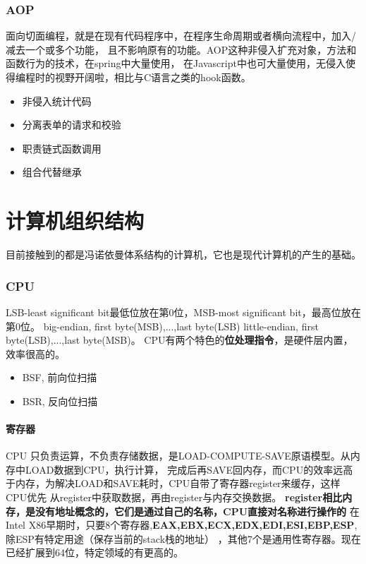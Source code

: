 \subsection{AOP}
面向切面编程，就是在现有代码程序中，在程序生命周期或者横向流程中，加入/减去一个或多个功能，
且不影响原有的功能。AOP这种非侵入扩充对象，方法和函数行为的技术，在spring中大量使用，
在Javascript中也可大量使用，无侵入使得编程时的视野开阔啦，相比与C语言之类的hook函数。
\begin{itemize}
    \item {非侵入统计代码}
    \item {分离表单的请求和校验}
    \item {职责链式函数调用}
    \item {组合代替继承}
\end{itemize}


\chapter{计算机组织结构}
目前接触到的都是冯诺依曼体系结构的计算机，它也是现代计算机的产生的基础。
\subsection{CPU}
LSB-least significant bit最低位放在第0位，MSB-most significant bit，最高位放在第0位。
\newline
big-endian, first byte(MSB),...,last byte(LSB)
\newline
little-endian, first byte(LSB),...,last byte(MSB)。
\newline
CPU有两个特色的\textbf{位处理指令}，是硬件层内置，效率很高的。
\begin{itemize}
    \item {BSF, 前向位扫描}
    \item {BSR, 反向位扫描}
\end{itemize}

\subsubsection{寄存器}
CPU 只负责运算，不负责存储数据，是LOAD-COMPUTE-SAVE原语模型。从内存中LOAD数据到CPU，执行计算，
完成后再SAVE回内存，而CPU的效率远高于内存，为解决LOAD和SAVE耗时，CPU自带了寄存器register来缓存，这样CPU优先
从register中获取数据，再由register与内存交换数据。
\newline
\textbf{register相比内存，是没有地址概念的，它们是通过自己的名称，CPU直接对名称进行操作的}
\newline
在Intel X86早期时，只要8个寄存器,\textbf{EAX,EBX,ECX,EDX,EDI,ESI,EBP,ESP},除ESP有特定用途（保存当前的stack栈的地址）
，其他7个是通用性寄存器。现在已经扩展到64位，特定领域的有更高的。 


